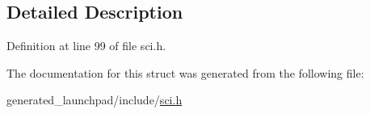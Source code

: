 \subsection{Detailed Description}


Definition at line 99 of file sci.\+h.



The documentation for this struct was generated from the following file\+:\begin{DoxyCompactItemize}
\item 
generated\+\_\+launchpad/include/\mbox{\hyperlink{sci_8h}{sci.\+h}}\end{DoxyCompactItemize}
